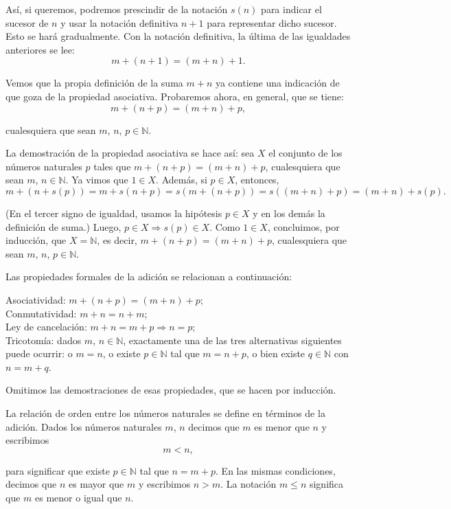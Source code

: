\documentclass[12pt,oneside]{book}
\begin{document}
Así, si queremos, podremos prescindir de la notación \(s(n)\) para indicar el sucesor de \(n\) y usar la notación definitiva \(n + 1\) para representar dicho sucesor. Esto se hará gradualmente. Con la notación definitiva, la última de las igualdades anteriores se lee:
\[m + (n + 1) = (m + n) + 1.\]

Vemos que la propia definición de la suma \(m + n\) ya contiene una indicación de que goza de la propiedad asociativa. Probaremos ahora, en general, que se tiene:
\[m + (n + p) = (m + n) + p,\]

cualesquiera que sean \(m\), \(n\), \(p \in \mathbb{N}\).

La demostración de la propiedad asociativa se hace así: sea \(X\) el conjunto de los números naturales \(p\) tales que \(m + (n + p) = (m + n) + p\), cualesquiera que sean \(m\), \(n \in \mathbb{N}\). Ya vimos que \(1 \in X\). Además, si \(p \in X\), entonces,
\[m + (n + s(p)) = m + s(n + p) = s(m + (n + p)) = s((m + n) + p) = (m + n) + s(p).\]

(En el tercer signo de igualdad, usamos la hipótesis \(p \in X\) y en los demás la definición de suma.) Luego, \(p \in X \Rightarrow s(p) \in X\). Como \(1 \in X\), concluimos, por inducción, que \(X = \mathbb{N}\), es decir, \(m + (n + p) = (m + n) + p\), cualesquiera que sean \(m\), \(n\), \(p \in \mathbb{N}\).

Las propiedades formales de la adición se relacionan a continuación:

Asociatividad: \(m + (n + p) = (m + n) + p\);\\
Conmutatividad: \(m + n = n + m\);\\
Ley de cancelación: \(m + n = m + p \Rightarrow n = p\);\\
Tricotomía: dados \(m\), \(n \in \mathbb{N}\), exactamente una de las tres alternativas siguientes puede ocurrir: o \(m = n\), o existe \(p \in \mathbb{N}\) tal que \(m = n + p\), o bien existe \(q \in \mathbb{N}\) con \(n = m + q\).

Omitimos las demostraciones de esas propiedades, que se hacen por inducción.

La relación de orden entre los números naturales se define en términos de la adición. Dados los números naturales \(m\), \(n\) decimos que \(m\) es menor que \(n\) y escribimos
\[m < n,\]

para significar que existe \(p \in \mathbb{N}\) tal que \(n = m + p\). En las mismas condiciones, decimos que \(n\) es mayor que \(m\) y escribimos \(n > m\). La notación \(m \leq n\) significa que \(m\) es menor o igual que \(n\).
\end{document}
